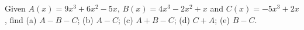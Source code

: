 Given $A(x)=9x^3+6x^2-5x$, $B(x)=4x^3-2x^2+x$ and $C(x)=-5x^3+2x$, find (a) $A-B-C$; (b) $A-C$; (c) $A+B-C$; (d) $C+A$; (e) $B-C$.
